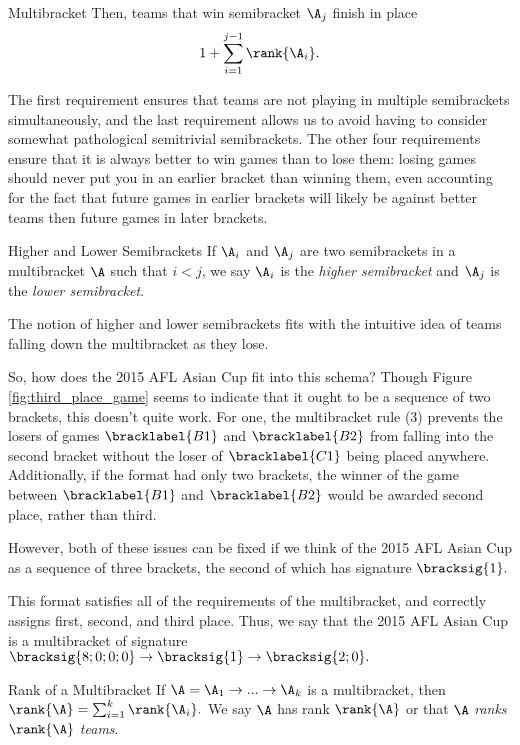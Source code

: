 {\begin{definition}{Multibracket}{}
        Then, teams that win semibracket $\A_j$ finish in place $$1 + \sum_{i=1}^{j-1} \rank{\A_i}.$$
    \end{definition}

    The first requirement ensures that teams are not playing in multiple semibrackets simultaneously, and the last requirement allows us to avoid having to consider somewhat pathological semitrivial semibrackets. The other four requirements ensure that it is always better to win games than to lose them: losing games should never put you in an earlier bracket than winning them, even accounting for the fact that future games in earlier brackets will likely be against better teams then future games in later brackets.

    \begin{definition}{Higher and Lower Semibrackets}{}
        If $\A_i$ and $\A_j$ are two semibrackets in a multibracket $\A$ such that $i < j$, we say $\A_i$ is the \textit{higher semibracket} and $\A_j$ is the \textit{lower semibracket}.
    \end{definition}

    The notion of higher and lower semibrackets fits with the intuitive idea of teams falling down the multibracket as they lose.

    So, how does the 2015 AFL Asian Cup fit into this schema? Though Figure \ref{fig:third_place_game} seems to indicate that it ought to be a sequence of two brackets, this doesn't quite work. For one, the multibracket rule (3) prevents the losers of games $\bracklabel{B1}$ and $\bracklabel{B2}$ from falling into the second bracket without the loser of $\bracklabel{C1}$ being placed anywhere. Additionally, if the format had only two brackets, the winner of the game between $\bracklabel{B1}$ and $\bracklabel{B2}$ would be awarded second place, rather than third.

    However, both of these issues can be fixed if we think of the 2015 AFL Asian Cup as a sequence of three brackets, the second of which has signature $\bracksig{1}.$


    This format satisfies all of the requirements of the multibracket, and correctly assigns first, second, and third place. Thus, we say that the 2015 AFL Asian Cup is a multibracket of signature $\bracksig{8;0;0;0} \to \bracksig{1} \to \bracksig{2;0}.$ 

    \begin{definition}{Rank of a Multibracket}{}
        If $\A = \A_1 \to ... \to \A_k$ is a multibracket, then $\rank{\A} = \sum_{i=1}^k \rank{\A_i}.$ We say $\A$ has rank $\rank{\A}$ or that $\A$ \textit{ranks $\rank{\A}$ teams}.
    \end{definition}

}
